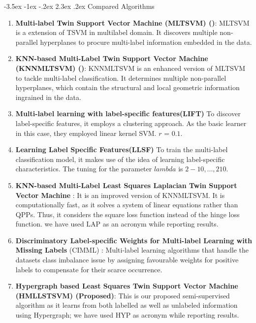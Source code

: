 \documentclass[12pt,a4paper,oneside,english]{report}
\makeatletter
\renewcommand\subsection{\@startsection {subsection}{1}{\z@}%
                                   {-3.5ex \@plus -1ex \@minus -.2ex}%
                                   {2.3ex \@plus.2ex}%
                                   {\centering\normalfont\Large\bfseries}}
\makeatother
\begin{document}
\subsection{Compared Algorithms}
\label{Compared Algorithms}
 \begin{enumerate}
 \item \textbf{Multi-label Twin Support Vector Machine  (MLTSVM) (\cite{chen2016mltsvm})}: MLTSVM is a extension of TSVM in multilabel domain. It discovers multiple non-parallel hyperplanes to procure multi-label information embedded in the data.

 
 \item \textbf{KNN-based Multi-Label Twin Support Vector Machine (KNNMLTSVM) (\cite{mir2018knn})}: KNNMLTSVM is an enhanced version of MLTSVM to tackle multi-label classification. It determines multiple non-parallel hyperplanes, which contain the structural and local geometric information ingrained in the data.
\item \textbf{Multi-label learning with label-specific features{(LIFT)}} \cite{zhang2014lift} To discover label-specific features, it employs a clustering approach. As the basic learner in this case, they employed linear kernel SVM. $r$ = $0.1$.
\item \textbf{Learning Label Specific Features{(LLSF)}} \cite{huang2016learning} To train the multi-label classification model, it makes use of the idea of learning label-specific characteristics. The tuning for the parameter $lambda$ is $2-10,..., 210$.

\item \textbf{KNN-based Multi-Label Least Squares Laplacian Twin Support Vector Machine} \cite{hanifelou2018knn}: It is an improved version of KNNMLTSVM. It is computationally fast, as it solves a system of linear equations rather than QPPs. Thus, it considers the square loss function instead of the hinge loss function.
we have used LAP as an acronym while reporting results.
\item \textbf{Discriminatory Label-specific Weights for Multi-label Learning with Missing Labels} (CIMML) \cite{Rastogi2023}: Multi-label learning algorithms that handle the datasets class imbalance issue by assigning favourable weights for positive labels to compensate for their scarce occurrence. 
\item \textbf{Hypergraph based Least Squares Twin Support Vector Machine (HMLLSTSVM) (Proposed)}: This is our proposed semi-supervised algorithm as it learns from both labelled as well as unlabeled information using Hypergraph; we have used HYP as acronym while reporting results.  

\end{enumerate}
\end{document}
